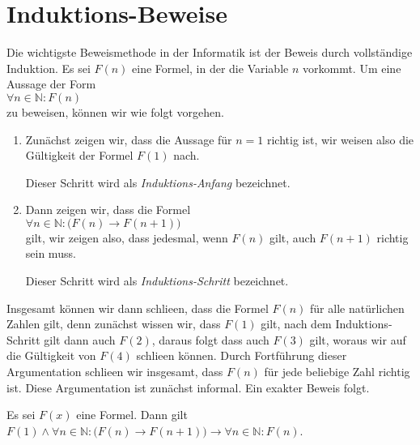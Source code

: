 \section{Induktions-Beweise}
Die wichtigste Beweismethode in der Informatik ist der Beweis durch vollst\"{a}ndige Induktion. Es sei
$F(n)$ eine Formel, in der die Variable $n$ vorkommt.  Um eine Aussage der Form
\\[0.2cm]
\hspace*{1.3cm}
$\forall n \in \mathbb{N}: F(n)$
\\[0.2cm]
zu beweisen, k\"{o}nnen wir wie folgt vorgehen.
\begin{enumerate}
\item Zun\"{a}chst zeigen wir, dass die Aussage f\"{u}r $n=1$ richtig ist, wir weisen also die G\"{u}ltigkeit der
      Formel $F(1)$ nach.

      Dieser Schritt wird als \emph{Induktions-Anfang} bezeichnet.
\item Dann zeigen wir, dass die Formel
      \\[0.2cm]
      \hspace*{1.3cm}
      $\forall n \in \mathbb{N} : \bigl( F(n) \rightarrow F(n+1)\bigr)$
      \\[0.2cm]
      gilt, wir zeigen also, dass jedesmal, wenn $F(n)$ gilt, auch $F(n+1)$ richtig sein muss.

      Dieser Schritt wird als \emph{Induktions-Schritt} bezeichnet.
\end{enumerate}
Insgesamt k\"{o}nnen wir dann schlie\3en, dass die Formel $F(n)$ f\"{u}r alle nat\"{u}rlichen Zahlen gilt, denn
zun\"{a}chst wissen wir, dass $F(1)$ gilt, nach dem Induktions-Schritt gilt dann auch $F(2)$, daraus folgt
dass auch $F(3)$ gilt, woraus wir auf die G\"{u}ltigkeit von $F(4)$ schlie\3en k\"{o}nnen.  Durch Fortf\"{u}hrung
dieser Argumentation schlie\3en wir insgesamt, dass $F(n)$ f\"{u}r jede beliebige Zahl richtig ist.  Diese
Argumentation ist zun\"{a}chst informal. Ein exakter Beweis folgt.

\begin{Satz}
  Es sei $F(x)$ eine Formel. Dann gilt
  \\[0.2cm]
  \hspace*{1.3cm}
  $F(1) \wedge \forall n \in \mathbb{N}:\bigl(F(n) \rightarrow F(n+1)\bigr) \rightarrow 
   \forall n \in \mathbb{N}: F(n)
  $.
\end{Satz}

